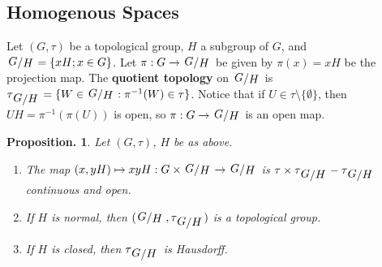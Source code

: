 \documentclass[11pt, a4paper]{memoir}
\theoremstyle{change}
\newtheorem{proposition}[theorem]{Proposition.}
\theoremstyle{plain}
\theoremstyle{nonumberplain}
\newcommand{\quot}[2]{\mathchoice{\left.\raisebox{0.14em}{$#1$}\middle/\raisebox{-0.14em}{$#2$}\right.}
                                 {\left.\raisebox{0.08em}{$#1$}\middle/\raisebox{-0.08em}{$#2$}\right.}
                                 {\left.\raisebox{0.03em}{$#1$}\middle/\raisebox{-0.03em}{$#2$}\right.}
                                 {\left.\raisebox{0em}{$#1$}\middle/\raisebox{0em}{$#2$}\right.}}
\newcommand{\defn}[1]{{\boldmath\bfseries #1}}
\numberwithin{equation}{section}
\begin{document}
\subsection{Homogenous Spaces}
Let $(G,\tau)$ be a topological group, $H$ a subgroup of $G$, and $\quot{G}{H}=\{xH;x\in G\}$.
Let $\pi:G\to \quot{G}{H}$ be given by $\pi(x)=xH$ be the projection map.
The \defn{quotient topology} on $\quot{G}{H}$ is $\tau_{\quot{G}{H}}=\{W\in \quot{G}{H}:\pi^{-1}(W)\in\tau\}$.
Notice that if $U\in\tau\setminus\{\emptyset\}$, then $UH=\pi^{-1}(\pi(U))$ is open, so $\pi:G\to \quot{G}{H}$ is an open map.
\begin{proposition}
    Let $(G,\tau)$, $H$ be as above.
    \begin{enumerate}[nl,r]
        \item The map $(x,yH)\mapsto xyH:G\times\quot{G}{H}\to\quot{G}{H}$ is $\tau\times\tau_{\quot{G}{H}}-\tau_{\quot{G}{H}}$ continuous and open.
        \item If $H$ is normal, then $(\quot{G}{H},\tau_{\quot{G}{H}})$ is a topological group.
        \item If $H$ is closed, then $\tau_{\quot{G}{H}}$ is Hausdorff.
    \end{enumerate}
\end{proposition}
\end{document}
